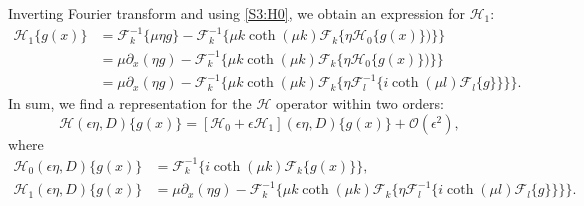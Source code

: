 Inverting Fourier transform and using \eqref{S3:H0}, we obtain an expression for $\mathcal{H}_1:$
\begin{align*}
\mathcal{H}_1 \{ g(x) \} &= \mathcal{F}^{-1}_k \{ \mu \eta g \} - \mathcal{F}^{-1}_k \{ \mu k \coth(\mu k) \mathcal{F}_k \{ \eta \mathcal{H}_0 \{ g(x) \}) \} \} \\
&= \mu \partial_x(\eta g) - \mathcal{F}^{-1}_k \{ \mu k \coth(\mu k) \mathcal{F}_k \{ \eta \mathcal{H}_0 \{ g(x) \}) \} \} \\
&= \mu \partial_x(\eta g) - \mathcal{F}^{-1}_k \{ \mu k \coth(\mu k) \mathcal{F}_k \{ \eta \mathcal{F}^{-1}_l \{i \coth(\mu l) \mathcal{F}_l\{g\} \} \} \}.
\end{align*}
In sum, we find a representation for the $\mathcal{H}$ operator within two orders:
\[ \mathcal{H}( \epsilon \eta, D)\{ g(x) \} = [ \mathcal{H}_0 + \epsilon \mathcal{H}_1]( \epsilon \eta, D)\{ g(x) \} + \mathcal{O}(\epsilon^2),\]
where 
\begin{align*}
\mathcal{H}_0( \epsilon \eta, D)\{ g(x) \} &= \mathcal{F}^{-1}_k\{i \coth(\mu k) \mathcal{F}_k\{g(x)\} \}, \\
\mathcal{H}_1( \epsilon \eta, D) \{ g(x) \} &= \mu \partial_x(\eta g) - \mathcal{F}^{-1}_k \{ \mu k \coth(\mu k) \mathcal{F}_k \{ \eta \mathcal{F}^{-1}_l\{i \coth(\mu l) \mathcal{F}_l\{g\}\} \} \}.
\end{align*}
